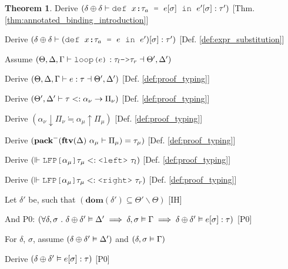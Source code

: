 \documentclass[acmsmall]{acmart}
\theoremstyle{definition}
\newtheorem{theorem}{Theorem}[section]
\begin{document}
\begin{theorem}
  \item \I\I \N Derive $(
    \delta \oplus \delta \entails \J{def } x \J{:} \tau_a \J{ = } e[\sigma] \J{ in } e'[\sigma] \hastype \tau'
  )$ [Thm. \ref{thm:annotated_binding_introduction}]

  \item \I\I \N Derive $(
    \delta \oplus \delta \entails (\J{def } x \J{:} \tau_a \J{ = } e \J{ in } e')[\sigma] \hastype \tau'
  )$ [Def. \ref{def:expr_substitution}]


  \item \N Assume $(
    \Theta, \Delta, \Gamma \entails \J{loop(}e\J{)} \hastype 
    \tau_l \J{->} \tau_r \given \Theta', \Delta'
  )$
  \item \I \N Derive $(
    \Theta, \Delta, \Gamma \vdash e : \tau \dashv  \Theta', \Delta'
  )$ [Def. \ref{def:proof_typing}]
  \item \I \N Derive $(
    \Theta', \Delta' \vdash \tau <: \alpha_\nu \rightarrow \Pi_\nu
  )$ [Def. \ref{def:proof_typing}]
  \item \I \N Derive $(
    \alpha_\nu \downarrow \Pi_\nu \fallingdotseq \alpha_\mu \uparrow \Pi_\mu
  )$ [Def. \ref{def:proof_typing}]
  \item \I \N Derive $(
    \textbf{pack}^-(\textbf{ftv}(\Delta)\ \alpha_\mu \vdash \Pi_\mu) = \tau_\mu
  )$ [Def. \ref{def:proof_typing}]
  \item \I \N Derive $(
    \factorsinto \J{LFP[} \alpha_\mu \J{]}\tau_\mu \subtypes \J{<left>}\ \tau_l
  )$ [Def. \ref{def:proof_typing}]
  \item \I \N Derive $(
    \factorsinto \J{LFP[} \alpha_\mu \J{]}\tau_\mu \subtypes \J{<right>}\ \tau_r
  )$ [Def. \ref{def:proof_typing}]

  \item \I \N Let $\delta'$ be, such that $(
    \textbf{dom}(\delta') \subseteq \Theta' \backslash \Theta
  )$ [IH]
  \item \I \N And P0: $(
    \forall \delta, \sigma \ .\  
    \delta \oplus \delta' \vDash \Delta' \implies
    \delta, \sigma \vDash \Gamma \implies
    \delta \oplus \delta' \vDash e[\sigma] : \tau
  )$ [P0]

  \item \I \N For $\delta$, $\sigma$,
    assume $(\delta \oplus \delta' \vDash \Delta')$
    and $(\delta, \sigma \vDash \Gamma)$

  \item \I\I \N Derive $(
    \delta \oplus \delta' \vDash e[\sigma] : \tau
  )$ [P0]


\end{theorem}
\end{document}
